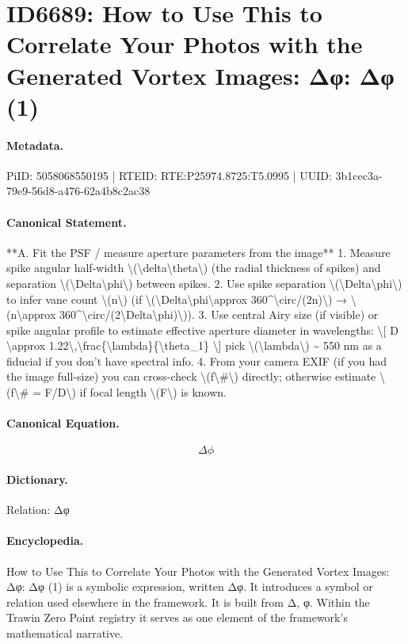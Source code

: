 \section*{ID6689: How to Use This to Correlate Your Photos with the Generated Vortex Images: Δφ: Δφ (1)}
\paragraph{Metadata.}
PiID: 5058068550195 | RTEID: RTE:P25974.8725:T5.0995 | UUID: 3b1cec3a-79e9-56d8-a476-62a4b8c2ac38

\paragraph{Canonical Statement.}
**A. Fit the PSF / measure aperture parameters from the image** 1. Measure spike angular half-width \textbackslash{}(\textbackslash{}delta\textbackslash{}theta\textbackslash{}) (the radial thickness of spikes) and separation \textbackslash{}(\textbackslash{}Delta\textbackslash{}phi\textbackslash{}) between spikes. 2. Use spike separation \textbackslash{}(\textbackslash{}Delta\textbackslash{}phi\textbackslash{}) to infer vane count \textbackslash{}(n\textbackslash{}) (if \textbackslash{}(\textbackslash{}Delta\textbackslash{}phi\textbackslash{}approx 360\textasciicircum{}\textbackslash{}circ/(2n)\textbackslash{}) → \textbackslash{}(n\textbackslash{}approx 360\textasciicircum{}\textbackslash{}circ/(2\textbackslash{}Delta\textbackslash{}phi)\textbackslash{})). 3. Use central Airy size (if visible) or spike angular profile to estimate effective aperture diameter in wavelengths: \textbackslash{}[ D \textbackslash{}approx 1.22\textbackslash{},\textbackslash{}frac\{\textbackslash{}lambda\}\{\textbackslash{}theta\_1\} \textbackslash{}] pick \textbackslash{}(\textbackslash{}lambda\textbackslash{}) \textasciitilde{} 550 nm as a fiducial if you don’t have spectral info. 4. From your camera EXIF (if you had the image full-size) you can cross-check \textbackslash{}(f\textbackslash{}\#\textbackslash{}) directly; otherwise estimate \textbackslash{}(f\textbackslash{}\# = F/D\textbackslash{}) if focal length \textbackslash{}(F\textbackslash{}) is known.

\paragraph{Canonical Equation.}
\[
\Delta\phi
\]

\paragraph{Dictionary.}
Relation: Δφ

\paragraph{Encyclopedia.}
How to Use This to Correlate Your Photos with the Generated Vortex Images: Δφ: Δφ (1) is a symbolic expression, written Δφ. It introduces a symbol or relation used elsewhere in the framework. It is built from Δ, φ. Within the Trawin Zero Point registry it serves as one element of the framework's mathematical narrative.
